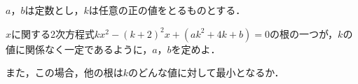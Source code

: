 \documentclass[../../main.tex]{subfiles}
\begin{document}
$a$，$b$は定数とし，$k$は任意の正の値をとるものとする．

$x$に関する2次方程式$kx^2-(k+2)^2x+(ak^2+4k+b)=0$の根の一つが，$k$の値に関係なく一定であるように，$a$，$b$を定めよ．

また，この場合，他の根は$k$のどんな値に対して最小となるか．
\end{document}
